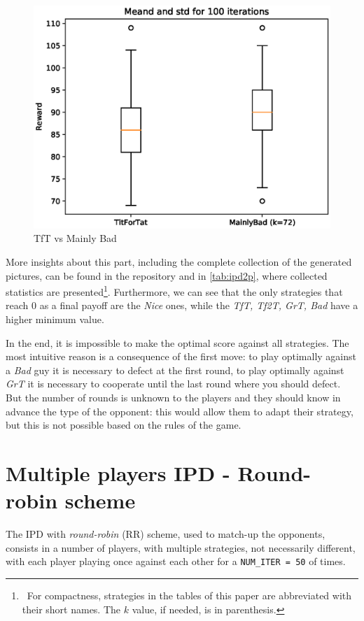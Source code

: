 \documentclass[journal,a4paper,10pt,twoside]{IEEEtran} %
\begin{document}
\begin{figure}[!ht]
    \centering
    \includegraphics[width=1\columnwidth]{../img/ipd2p/ipd2p-boxplot-TitForTat-MainlyBad(k=72)}
    \caption{TfT vs Mainly Bad}
    \label{fig:boxmbvtft}
\end{figure}

More insights about this part, including the complete collection of the generated pictures, can be found in the repository and in \autoref{tab:ipd2p}, where collected statistics are presented\footnote{~For compactness, strategies in the tables of this paper are abbreviated with their short names. The $k$ value, if needed, is in parenthesis.}. Furthermore, we can see that the only strategies that reach $0$ as a final payoff are the \textit{Nice} ones, while the \textit{TfT, Tf2T, GrT, Bad} have a higher minimum value.

In the end, it is impossible to make the optimal score against all strategies. The most intuitive reason is a consequence of the first move: to play optimally against a \textit{Bad} guy it is necessary to defect at the first round, to play optimally against \textit{GrT} it is necessary to cooperate until the last round where you should defect.~\cite{mathieu2017}
But the number of rounds is unknown to the players and they should know in advance the type of the opponent: this would allow them to adapt their strategy, but this is not possible based on the rules of the game. 

\section{Multiple players IPD - Round-robin scheme} \label{s:IPDMP}
The IPD with \textit{round-robin} (RR) scheme, used to match-up the opponents, consists in a number of players, with multiple strategies, not necessarily different, with each player playing once against each other for a \texttt{NUM\_ITER = 50} of times.
\end{document}
